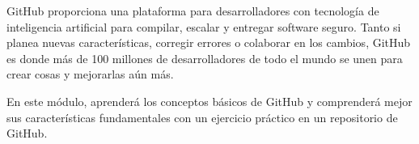 GitHub proporciona una plataforma para desarrolladores con tecnología de inteligencia artificial
para compilar, escalar y entregar software seguro. Tanto si planea nuevas características, corregir
errores o colaborar en los cambios, GitHub es donde más de 100 millones de desarrolladores de todo el 
mundo se unen para crear cosas y mejorarlas aún más.

En este módulo, aprenderá los conceptos básicos de GitHub y comprenderá mejor sus características 
fundamentales con un ejercicio práctico en un repositorio de GitHub.

